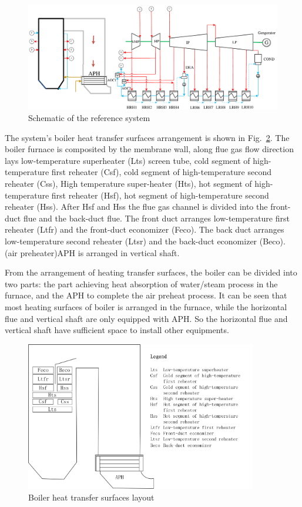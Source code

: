 \documentclass[preprint,12pt]{elsarticle}
\begin{document}
\begin{figure}[htbp]
\centering
\includegraphics[width=1\textwidth]{fig/reference_system}
\caption{Schematic of the reference system} 
\label{fig:reference_system}
\end{figure}
The system's boiler heat transfer surfaces arrangement is shown in Fig.~\ref{fig:boiler_surface}. 
The boiler furnace is composited by the membrane wall, along flue gas flow direction lays low-temperature superheater (Lts) screen tube, cold segment of high-temperature first reheater (Csf), cold segment of high-temperature second reheater (Css), High temperature super-heater (Hts), hot segment of high-temperature first reheater (Hsf), hot segment of high-temperature second reheater (Hss).
After Hsf and Hss the flue gas channel is divided into the front-duct flue and the back-duct flue.
The front duct arranges low-temperature first reheater (Ltfr) and the front-duct economizer (Feco).
The back duct arranges low-temperature second reheater (Ltsr) and the back-duct economizer (Beco).
(air preheater)APH is arranged in vertical shaft.

From the arrangement of heating transfer surfaces, the boiler can be divided into two parts: the part achieving heat absorption of water/steam process in the furnace, and the APH to complete the air preheat process.
It can be seen that most heating surfaces of boiler is arranged in the furnace, while the horizontal flue and vertical shaft are only equipped with APH.
So the horizontal flue and vertical shaft have sufficient space to install other equipments.

\begin{figure}[htbp]
\centering
\includegraphics[width=0.9\textwidth]{fig/boiler_surface.png}
\caption{Boiler heat transfer surfaces layout} 
\label{fig:boiler_surface}
\end{figure}
\end{document}
